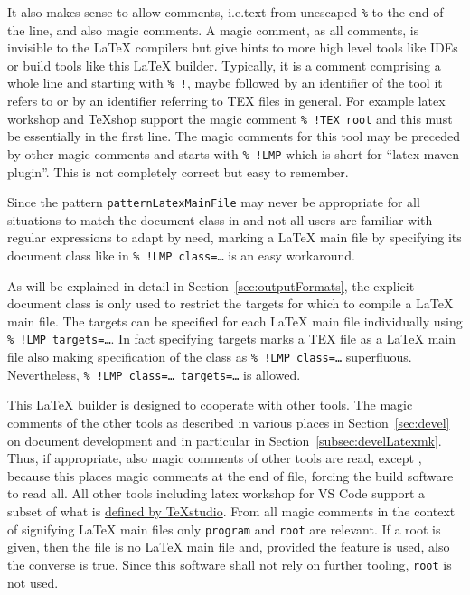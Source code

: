 It also makes sense to allow comments, 
i.e.\@ text from unescaped \texttt{\%} to the end of the line, 
and also magic comments. 
A magic comment, as all comments, is invisible to the \LaTeX{} compilers 
but give hints to more high level tools 
like IDEs or build tools like this \LaTeX{} builder. 
Typically, it is a comment comprising a whole line and starting with \texttt{\%~!}, 
maybe followed by an identifier of the tool it refers to 
or by an identifier referring to TEX files in general. 
For example latex workshop and \TeX{}shop support the magic comment \texttt{\%~!TEX root} 
and this must be essentially in the first line. 
The magic comments for this tool may be preceded by other magic comments 
and starts with \texttt{\%~!LMP} which is short for ``latex maven plugin''. 
This is not completely correct but easy to remember. 


Since the pattern \texttt{patternLatexMainFile} may never be appropriate for all situations 
to match the document class in  
and not all users are familiar with regular expressions to adapt by need, 
marking a \LaTeX{} main file by specifying its document class like in 
\texttt{\%~!LMP class=\dots} is an easy workaround. 

As will be explained in detail in Section~\ref{sec:outputFormats}, 
the explicit document class is only used 
to restrict the targets for which to compile a \LaTeX{} main file. 
The targets can be specified for each \LaTeX{} main file individually 
using \texttt{\%~!LMP targets=\dots}. 
In fact specifying targets marks a TEX file as a \LaTeX{} main file also 
making specification of the class as \texttt{\%~!LMP class=\dots} superfluous. 
Nevertheless, \texttt{\%~!LMP class=\dots\ targets=\dots} is allowed. 

This \LaTeX{} builder is designed to cooperate with other tools. 
The magic comments of the other tools as described in various places in Section~\ref{sec:devel} 
on document development and in particular in Section~\ref{subsec:develLatexmk}. 
Thus, if appropriate, also magic comments of other tools are read, 
except \auctex, because this places magic comments at the end of file, 
forcing the build software to read all. 
All other tools including latex workshop for VS Code 
support a subset of what is 
\href{http://transit.iut2.upmf-grenoble.fr/doc/texstudio/html/usermanual_en.html#TEXCOM}%
{defined by \TeX{}studio}. 
From all magic comments in the context of signifying \LaTeX{} main files 
only \texttt{program} and \texttt{root} are relevant. 
If a root is given, then the file is no \LaTeX{} main file 
and, provided the feature is used, also the converse is true. 
Since this software shall not rely on further tooling, 
\texttt{root} is not used. 

